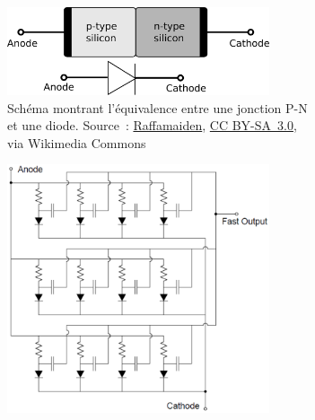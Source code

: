 \begin{figure}
    \centering
    \begin{subfigure}[c]{0.45\textwidth}
        \centering
        \includegraphics[trim= 0 -585 0 -585, width=0.85\textwidth]{img/she/1920px-PN_diode_with_electrical_symbol.svg.png}
        \captionsetup{width=.85\textwidth}
        \caption{Schéma montrant l'équivalence entre une jonction P-N et une diode. Source~: \href{https://commons.wikimedia.org/wiki/File:PN_diode_with_electrical_symbol.svg}{Raffamaiden}, \href{https://creativecommons.org/licenses/by-sa/3.0}{CC BY-SA~3.0}, via Wikimedia Commons}
        \label{fig_pn_diode}
    \end{subfigure}
    \begin{subfigure}[c]{0.45\textwidth}
        \centering
        \includegraphics[width=0.85\textwidth]{img/she/SiPM_arithecture.png}

\end{subfigure}
\end{figure}
